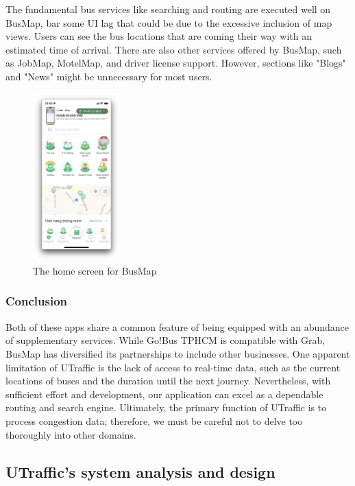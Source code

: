 The fundamental bus services like searching and routing are executed well on BusMap, bar some UI lag that could be due to the excessive inclusion of map views. Users can see the bus locations that are coming their way with an estimated time of arrival. There are also other services offered by BusMap, such as JobMap, MotelMap, and driver license support. However, sections like "Blogs" and "News" might be unnecessary for most users.

\begin{figure}[H]
    \centering
    \includegraphics[width=0.3\textwidth]{assets/images/Research/Bus/busmap_home.png}
    \caption{The home screen for BusMap}
    \label{fig:busmap_homescreen}
\end{figure}

\subsubsection{Conclusion}

Both of these apps share a common feature of being equipped with an abundance of supplementary services. While Go!Bus TPHCM is compatible with Grab, BusMap has diversified its partnerships to include other businesses. One apparent limitation of UTraffic is the lack of access to real-time data, such as the current locations of buses and the duration until the next journey. Nevertheless, with sufficient effort and development, our application can excel as a dependable routing and search engine. Ultimately, the primary function of UTraffic is to process congestion data; therefore, we must be careful not to delve too thoroughly into other domains.

\subsection{UTraffic's system analysis and design}

